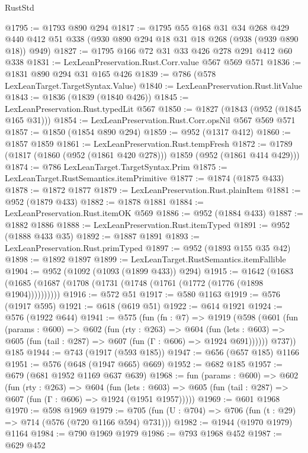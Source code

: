 \begin{lexlean}{RustStd}
\begin{coremodule}
@1795 := @1793 @890 @294
@1817 := @1795
    @55
    @168
    @31
    @34
    @268
    @429
    @440
    @412
    @51
    @338
    (@930 @890 @294 @18 @31 @18 @268 (@938 (@939 @890 @18)) @949)
@1827 := @1795 @166 @72 @31 @33 @426 @278 @291 @412 @60 @338
@1831 := LexLeanPreservation.Rust.Corr.value @567 @569 @571
@1836 := @1831 @890 @294 @31 @165 @426
@1839 := @786 (@578 LexLeanTarget.TargetSyntax.Value)
@1840 := LexLeanPreservation.Rust.litValue
@1843 := @1836 (@1839 (@1840 @426))
@1845 := LexLeanPreservation.Rust.typedLit @567
@1850 := @1827 (@1843 (@952 (@1845 @165 @31)))
@1854 := LexLeanPreservation.Rust.Corr.opsNil @567 @569 @571
@1857 := @1850 (@1854 @890 @294)
@1859 := @952 (@1317 @412)
@1860 := @1857 @1859
@1861 := LexLeanPreservation.Rust.tempFresh
@1872 := @1789 (@1817 (@1860 (@952 (@1861 @420 @278))) @1859 (@952 (@1861 @414 @429)))
@1874 := @786 LexLeanTarget.TargetSyntax.Prim
@1875 := LexLeanTarget.RustSemantics.itemPrimitive
@1877 := @1874 (@1875 @433)
@1878 := @1872 @1877
@1879 := LexLeanPreservation.Rust.plainItem
@1881 := @952 (@1879 @433)
@1882 := @1878 @1881
@1884 := LexLeanPreservation.Rust.itemOK @569
@1886 := @952 (@1884 @433)
@1887 := @1882 @1886
@1888 := LexLeanPreservation.Rust.itemTyped
@1891 := @952 (@1888 @433 @35)
@1892 := @1887 @1891
@1893 := LexLeanPreservation.Rust.primTyped
@1897 := @952 (@1893 @155 @35 @42)
@1898 := @1892 @1897
@1899 := LexLeanTarget.RustSemantics.itemFallible
@1904 := @952 (@1092 (@1093 (@1899 @433)) @294)
@1915 := @1642 (@1683 (@1685 (@1687 (@1708 (@1731 (@1748 (@1761 (@1772 (@1776 (@1898 @1904))))))))))
@1916 := @572 @51
@1917 := @580 @1163
@1919 := @576 (@1917 @595)
@1921 := @618 (@619 @51)
@1922 := @614 @1921
@1924 := @576 (@1922 @644)
@1941 := @575
    (fun (fn : @7) =>
    @1919
      (@598
        (@601
          (fun (params : @600) =>
          @602
            (fun (rty : @263) =>
            @604
              (fun (lets : @603) =>
              @605 (fun (tail : @287) => @607 (fun (Γ : @606) => @1924 @691))))))
        @737))
    @185
@1944 := @743 (@1917 (@593 @185))
@1947 := @656 (@657 @185) @1166
@1951 := @576 (@648 (@1947 @665) @669)
@1952 := @682 @185
@1957 := @679 (@681 @1952 @1169 @637 @639)
@1968 := fun (params : @600) =>
  @602
    (fun (rty : @263) =>
    @604
      (fun (lets : @603) =>
      @605 (fun (tail : @287) => @607 (fun (Γ : @606) => @1924 (@1951 @1957)))))
@1969 := @601 @1968
@1970 := @598 @1969
@1979 := @705 (fun (U : @704) => @706 (fun (t : @29) => @714 (@576 (@720 @1166 @594) @731)))
@1982 := @1944 (@1970 @1979) @1164
@1984 := @790 @1969 @1979
@1986 := @793 @1968 @452
@1987 := @629 @452

\end{coremodule}
\end{lexlean}
